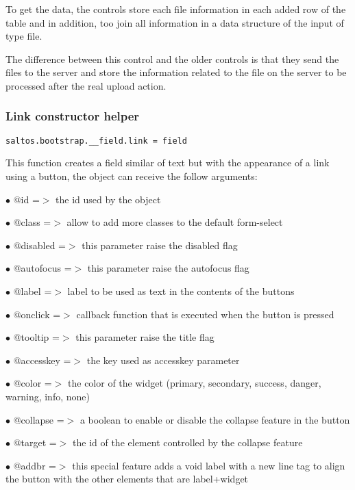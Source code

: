 \documentclass[a4paper]{article}
\begin{document}
To get the data, the controls store each file information in each added row of the table and
in addition, too join all information in a data structure of the input of type file.

The difference between this control and the older controls is that they send the files to
the server and store the information related to the file on the server to be processed after
the real upload action.

\hypertarget{toc628}{}
\subsubsection{Link constructor helper}

\begin{lstlisting}
saltos.bootstrap.__field.link = field
\end{lstlisting}

This function creates a field similar of text but with the appearance of a link using a button,
the object can receive the follow arguments:

\begin{compactitem}
\item[\color{myblue}$\bullet$] @id        =$>$ the id used by the object
\item[\color{myblue}$\bullet$] @class     =$>$ allow to add more classes to the default form-select
\item[\color{myblue}$\bullet$] @disabled  =$>$ this parameter raise the disabled flag
\item[\color{myblue}$\bullet$] @autofocus =$>$ this parameter raise the autofocus flag
\item[\color{myblue}$\bullet$] @label     =$>$ label to be used as text in the contents of the buttons
\item[\color{myblue}$\bullet$] @onclick   =$>$ callback function that is executed when the button is pressed
\item[\color{myblue}$\bullet$] @tooltip   =$>$ this parameter raise the title flag
\item[\color{myblue}$\bullet$] @accesskey =$>$ the key used as accesskey parameter
\item[\color{myblue}$\bullet$] @color     =$>$ the color of the widget (primary, secondary, success, danger, warning, info, none)
\item[\color{myblue}$\bullet$] @collapse  =$>$ a boolean to enable or disable the collapse feature in the button
\item[\color{myblue}$\bullet$] @target    =$>$ the id of the element controlled by the collapse feature
\item[\color{myblue}$\bullet$] @addbr     =$>$ this special feature adds a void label with a new line tag to align the button with
              the other elements that are label+widget
\end{compactitem}
\end{document}
